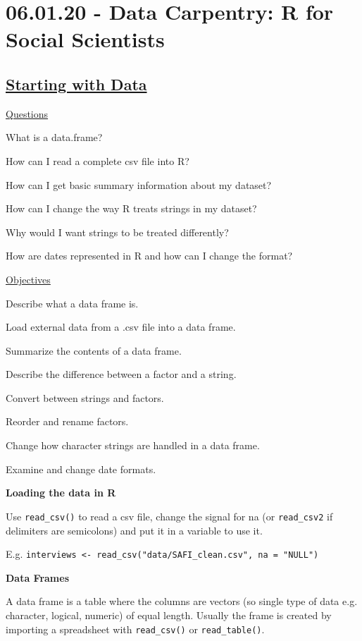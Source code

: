 \documentclass[12pt]{article}
\begin{document}
\newpage\section{06.01.20 - Data Carpentry: R for Social Scientists}

\subsection{\href{https://datacarpentry.org/r-socialsci/02-starting-with-data/index.html}{\textbf{Starting with Data}}}
\color{gray}
\underline{Questions}

What is a data.frame?

How can I read a complete csv file into R?

How can I get basic summary information about my dataset?

How can I change the way R treats strings in my dataset?

Why would I want strings to be treated differently?

How are dates represented in R and how can I change the format?

\underline{Objectives}

Describe what a data frame is.

Load external data from a .csv file into a data frame.

Summarize the contents of a data frame.

Describe the difference between a factor and a string.

Convert between strings and factors.

Reorder and rename factors.

Change how character strings are handled in a data frame.

Examine and change date formats.
\color{black}
\vspace{1em}

\textbf{Loading the data in R}

Use \texttt{read\_csv()} to read a csv file, change the signal for na (or \texttt{read\_csv2} if delimiters are semicolons) and put it in a variable to use it.

E.g. \texttt{interviews <- read\_csv("data/SAFI\_clean.csv", na = "NULL")}

\textbf{Data Frames}

A data frame is a table where the columns are vectors (so single type of data e.g. character, logical, numeric) of equal length. Usually the frame is created by importing a spreadsheet with \texttt{read\_csv()} or \texttt{read\_table()}.
\end{document}
